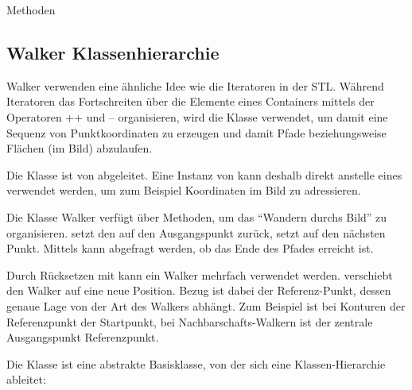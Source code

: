 


Methoden




\subsection{Walker Klassenhierarchie}
\hypertarget{Walker}{}

Walker verwenden eine ähnliche Idee wie die Iteratoren in der STL. 
Während Iteratoren das Fortschreiten über die Elemente eines 
Containers mittels der Operatoren ++ und -- organisieren, 
wird die Klasse  verwendet, um damit eine Sequenz 
von Punktkoordinaten zu erzeugen und damit Pfade beziehungsweise 
Flächen (im Bild) abzulaufen.

Die Klasse  ist von  abgeleitet. Eine 
Instanz von  kann deshalb direkt anstelle 
eines  verwendet werden, um zum Beispiel Koordinaten 
im Bild zu adressieren.

Die Klasse Walker verfügt über Methoden, um das ``Wandern durchs Bild''
zu organisieren. 
 setzt den  auf den Ausgangspunkt zurück, 
 setzt auf den nächsten Punkt.
Mittels  kann abgefragt werden, ob das Ende des 
Pfades erreicht ist.

Durch Rücksetzen mit  kann ein Walker mehrfach 
verwendet werden.  verschiebt den 
Walker auf eine neue Position. Bezug ist dabei der Referenz-Punkt, 
dessen genaue Lage von der Art des Walkers abhängt. Zum Beispiel ist 
bei Konturen der Referenzpunkt der Startpunkt, bei 
Nachbarschafts-Walkern ist der zentrale Ausgangspunkt Referenzpunkt.

Die Klasse  ist eine abstrakte Basisklasse, von der 
sich eine Klassen-Hierarchie ableitet:

